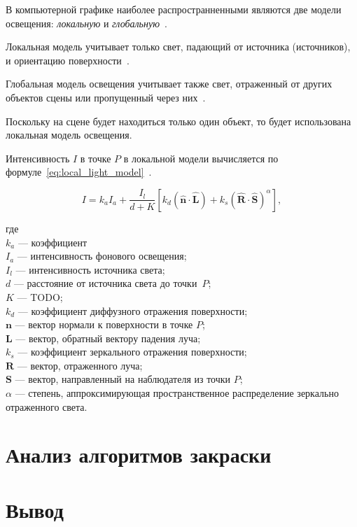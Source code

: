     В компьютерной графике наиболее распространненными являются две модели освещения: \textit{локальную} и \textit{глобальную}~\cite{rogers}.
    
    Локальная модель учитывает только свет, падающий от источника (источников), и ориентацию поверхности~\cite{rogers}.
    
    Глобальная модель освещения учитывает также свет, отраженный от других объектов сцены или пропущенный через них~\cite{rogers}.
    
    Поскольку на сцене будет находиться только один объект, то будет использована локальная модель освещения.
    
    Интенсивность $I$ в точке $P$ в локальной модели вычисляется по формуле~\ref{eq:local_light_model}~\cite{rogers}.
    
    \begin{equation}
    	\label{eq:local_light_model}
    	I = k_aI_a + \frac{I_l}{d + K}[k_d(\mathbf{\hat{n}\cdot \hat{L}})+k_s(\mathbf{\hat{R}\cdot \hat{S}})^\alpha],
    \end{equation}
    
    где \\
    $k_a$ --- коэффициент \\
    $I_a$ --- интенсивность фонового освещения; \\
    $I_l$ --- интенсивность источника света; \\
    $d$ --- расстояние от источника света до точки~$P$; \\
    $K$ --- TODO; \\
    $k_d$ --- коэффициент диффузного отражения поверхности; \\
    $\mathbf{n}$ --- вектор нормали к поверхности в точке $P$; \\
    $\mathbf{L}$ --- вектор, обратный вектору падения луча; \\
    $k_s$ --- коэффициент зеркального отражения поверхности; \\
    $\mathbf{R}$ --- вектор, отраженного луча; \\
    $\mathbf{S}$ --- вектор, направленный на наблюдателя из точки $P$; \\
    $\alpha$ --- степень, аппроксимирующая пространственное распределение зеркально отраженного света.
        
    \section{Анализ алгоритмов закраски}
    
\section*{Вывод}

\clearpage